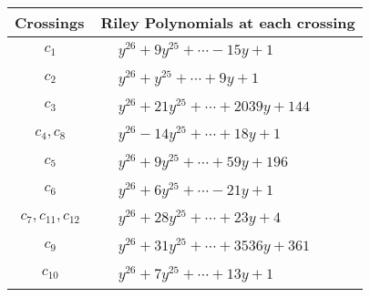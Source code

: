 \documentclass[1p]{elsarticle_modified}
\theoremstyle{definition}
\begin{document}
\begin{tabular}{m{50pt}|m{274pt}}
Crossings & \hspace{64pt}Riley Polynomials at each crossing \\
\hline $$\begin{aligned}c_{1}\end{aligned}$$&$\begin{aligned}
&y^{26}+9 y^{25}+\cdots-15 y+1
\end{aligned}$\\
\hline $$\begin{aligned}c_{2}\end{aligned}$$&$\begin{aligned}
&y^{26}+y^{25}+\cdots+9 y+1
\end{aligned}$\\
\hline $$\begin{aligned}c_{3}\end{aligned}$$&$\begin{aligned}
&y^{26}+21 y^{25}+\cdots+2039 y+144
\end{aligned}$\\
\hline $$\begin{aligned}c_{4},c_{8}\end{aligned}$$&$\begin{aligned}
&y^{26}-14 y^{25}+\cdots+18 y+1
\end{aligned}$\\
\hline $$\begin{aligned}c_{5}\end{aligned}$$&$\begin{aligned}
&y^{26}+9 y^{25}+\cdots+59 y+196
\end{aligned}$\\
\hline $$\begin{aligned}c_{6}\end{aligned}$$&$\begin{aligned}
&y^{26}+6 y^{25}+\cdots-21 y+1
\end{aligned}$\\
\hline $$\begin{aligned}c_{7},c_{11},c_{12}\end{aligned}$$&$\begin{aligned}
&y^{26}+28 y^{25}+\cdots+23 y+4
\end{aligned}$\\
\hline $$\begin{aligned}c_{9}\end{aligned}$$&$\begin{aligned}
&y^{26}+31 y^{25}+\cdots+3536 y+361
\end{aligned}$\\
\hline $$\begin{aligned}c_{10}\end{aligned}$$&$\begin{aligned}
&y^{26}+7 y^{25}+\cdots+13 y+1
\end{aligned}$\\
\hline
\end{tabular}\\~\\
\end{document}

